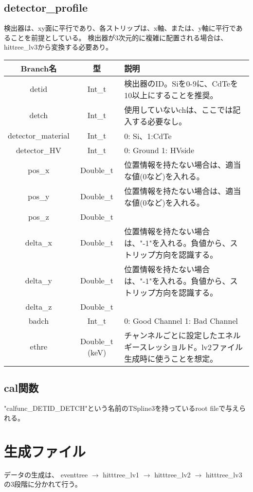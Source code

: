 \documentclass[10.5pt]{jsarticle}
\begin{document}
\subsection{detector\_profile}
検出器は、xy面に平行であり、各ストリップは、x軸、または、y軸に平行であることを前提としている。
検出器が3次元的に複雑に配置される場合は、hittree\_lv3から変換する必要あり。
\begin{table}[htb]
  \begin{tabular}{|c|c|p{10cm}|} \hline
  Branch名 & 型 & 説明 \\ \hline
  detid & Int\_t  & 検出器のID。Siを0-9に、CdTeを10以上にすることを推奨。\\
  detch & Int\_t &  使用していないchは、ここでは記入する必要なし。\\
  detector\_material & Int\_t & 0: Si、1:CdTe\\
  detector\_HV & Int\_t & 0: Ground 1: HVside\\
  pos\_x  & Double\_t & 位置情報を持たない場合は、適当な値(0など)を入れる。\\
   pos\_y  & Double\_t & 位置情報を持たない場合は、適当な値(0など)を入れる。\\
   pos\_z  & Double\_t & \\
   delta\_x  & Double\_t & 位置情報を持たない場合は、"-1"を入れる。負値から、ストリップ方向を認識する。\\
   delta\_y  & Double\_t & 位置情報を持たない場合は、"-1"を入れる。負値から、ストリップ方向を認識する。\\
   delta\_z  & Double\_t & \\
   badch & Int\_t & 0: Good Channel 1: Bad Channel \\
   ethre & Double\_t  (keV) & チャンネルごとに設定したエネルギースレッショルド。lv2ファイル生成時に使うことを想定。 \\
   \hline
  \end{tabular}
\end{table}

\subsection{cal関数}
"calfunc\_DETID\_DETCH"という名前のTSpline3を持っているroot fileで与えられる。

\section{生成ファイル}
データの生成は、
eventtree $\to$
hitttree\_lv1 $\to$
hitttree\_lv2 $\to$
hitttree\_lv3
の3段階に分かれて行う。
\end{document}
